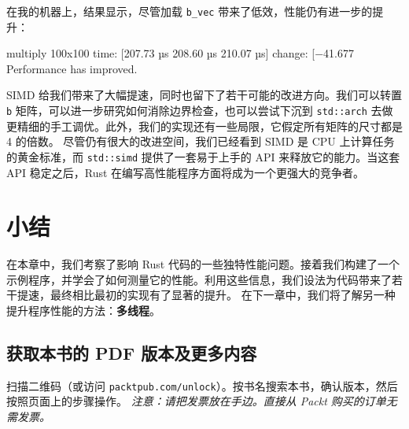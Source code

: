 在我的机器上，结果显示，尽管加载 \texttt{b\_vec} 带来了低效，性能仍有进一步的提升：
\begin{codeboxdark}
multiply 100x100         time:   [207.73 µs 208.60 µs 210.07 µs]
                         change: [−41.677%
                         Performance has improved.
\end{codeboxdark}
SIMD 给我们带来了大幅提速，同时也留下了若干可能的改进方向。我们可以转置 \texttt{b} 矩阵，可以进一步研究如何消除边界检查，也可以尝试下沉到 \texttt{std::arch} 去做更精细的手工调优。此外，我们的实现还有一些局限，它假定所有矩阵的尺寸都是 4 的倍数。
\label{idx:idx_faa87e88}
尽管仍有很大的改进空间，我们已经看到 SIMD 是 CPU 上计算任务的黄金标准，而 \texttt{std::simd} 提供了一套易于上手的 API 来释放它的能力。当这套 API 稳定之后，Rust 在编写高性能程序方面将成为一个更强大的竞争者。
\section{小结}
在本章中，我们考察了影响 Rust 代码的一些独特性能问题。接着我们构建了一个示例程序，并学会了如何测量它的性能。利用这些信息，我们设法为代码带来了若干提速，最终相比最初的实现有了显著的提升。
在下一章中，我们将了解另一种提升程序性能的方法：\textbf{多线程}。
\begin{samepage}
\subsection{获取本书的 PDF 版本及更多内容}
扫描二维码（或访问 \texttt{packtpub.\allowbreak{}com/\allowbreak{}unlock}）。按书名搜索本书，确认版本，然后按照页面上的步骤操作。
\emph{注意：请把发票放在手边。直接从 Packt 购买的订单无需发票。}
\end{samepage}
